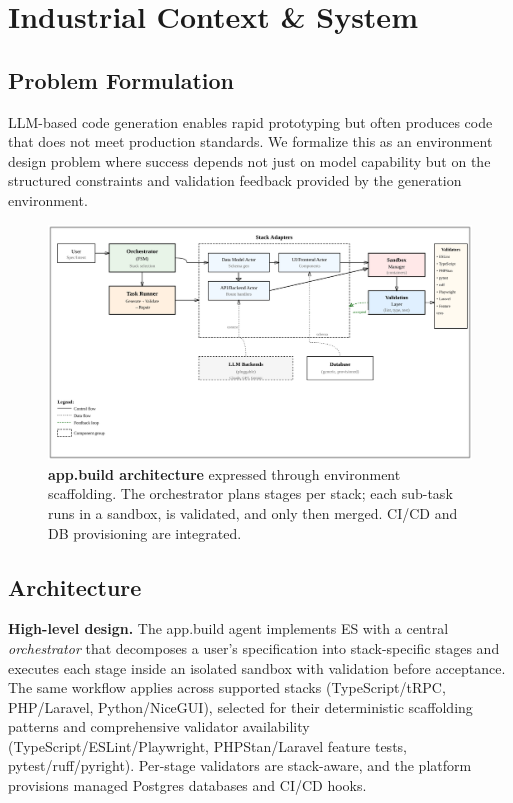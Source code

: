\documentclass[conference]{IEEEtran}
\begin{document}
\section{Industrial Context \& System}
\label{sec:method}

\subsection{Problem Formulation}

LLM-based code generation enables rapid prototyping but often produces code that does not meet production standards. We formalize this as an environment design problem where success depends not just on model capability but on the structured constraints and validation feedback provided by the generation environment.

\begin{figure}[t]
  \centering
  \includegraphics[width=\linewidth]{diagrams/appbuild-arch.png}
  \caption{\textbf{app.build architecture} expressed through environment scaffolding. The orchestrator plans stages per stack; each sub-task runs in a sandbox, is validated, and only then merged. CI/CD and DB provisioning are integrated.}
  \label{fig:appbuild-arch}
\end{figure}

\subsection{Architecture}

\textbf{High-level design.} The app.build agent implements ES with a central \emph{orchestrator} that decomposes a user's specification into stack-specific stages and executes each stage inside an isolated sandbox with validation before acceptance. The same workflow applies across supported stacks (TypeScript/tRPC, PHP/Laravel, Python/NiceGUI), selected for their deterministic scaffolding patterns and comprehensive validator availability (TypeScript/ESLint/Playwright, PHPStan/Laravel feature tests, pytest/ruff/pyright). Per-stage validators are stack-aware, and the platform provisions managed Postgres databases and CI/CD hooks.
\end{document}
